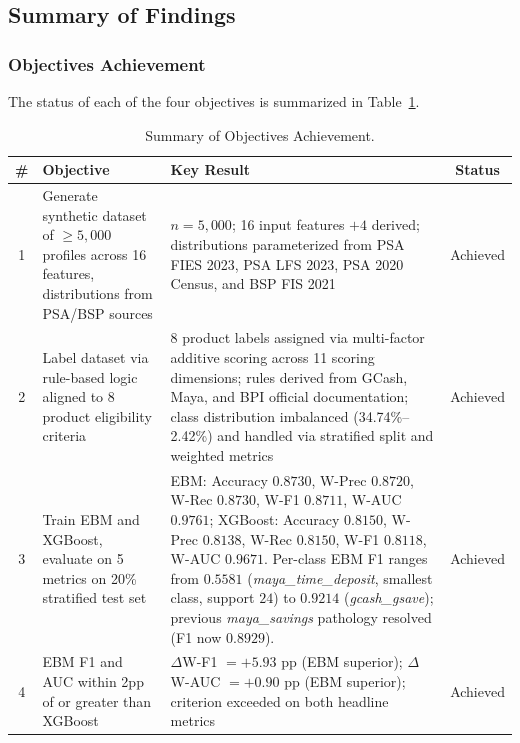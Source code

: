 \documentclass{icsthesis}
\begin{document}
\begin{mainmatter}
			\subsection{Summary of Findings}
				\subsubsection{Objectives Achievement}
					The status of each of the four objectives is summarized in Table~\ref{tab:obj}.

					\begin{table}[ht]
					\vspace{4ex}
					\centering
					\caption{Summary of Objectives Achievement.}
					\label{tab:obj}
					\footnotesize
					\begin{tabular}{|c|p{4.5cm}|p{6.5cm}|c|}
						\hline
						\textbf{\#} & \textbf{Objective} & \textbf{Key Result} & \textbf{Status} \\
						\hline
						1 & Generate synthetic dataset of $\geq 5{,}000$ profiles across 16 features, distributions from PSA/BSP sources & $n = 5{,}000$; 16 input features $+ 4$ derived; distributions parameterized from PSA FIES 2023, PSA LFS 2023, PSA 2020 Census, and BSP FIS 2021 & Achieved \\
						\hline
						2 & Label dataset via rule-based logic aligned to 8 product eligibility criteria & 8 product labels assigned via multi-factor additive scoring across 11 scoring dimensions; rules derived from GCash, Maya, and BPI official documentation; class distribution imbalanced (34.74\%--2.42\%) and handled via stratified split and weighted metrics & Achieved \\
						\hline
						3 & Train EBM and XGBoost, evaluate on 5 metrics on 20\% stratified test set & EBM: Accuracy $0.8730$, W-Prec $0.8720$, W-Rec $0.8730$, W-F1 $0.8711$, W-AUC $0.9761$; XGBoost: Accuracy $0.8150$, W-Prec $0.8138$, W-Rec $0.8150$, W-F1 $0.8118$, W-AUC $0.9671$. Per-class EBM F1 ranges from $0.5581$ (\emph{maya\_time\_deposit}, smallest class, support $24$) to $0.9214$ (\emph{gcash\_gsave}); previous \emph{maya\_savings} pathology resolved (F1 now $0.8929$). & Achieved \\
						\hline
						4 & EBM F1 and AUC within 2pp of or greater than XGBoost & $\Delta$W-F1 $= +5.93$ pp (EBM superior); $\Delta$W-AUC $= +0.90$ pp (EBM superior); criterion exceeded on both headline metrics & Achieved \\
						\hline
					\end{tabular}
					\vspace{4ex}
					\end{table}


\end{mainmatter}
\end{document}
